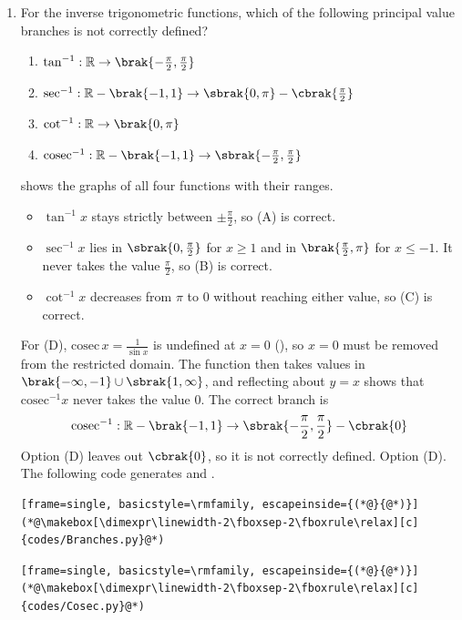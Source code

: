 \begin{enumerate}[label=\thesubsection.\arabic*, ref=\thesubsection.\theenumi]
\item For the inverse trigonometric functions, which of the following principal value branches is not correctly defined?
\begin{enumerate}[label=(\Alph*)]
	\item $\tan^{-1}: \mathbb{R} \to \brak{-\frac{\pi}{2}, \frac{\pi}{2}}$
	\item $\sec^{-1}: \mathbb{R}-\brak{-1,1} \to \sbrak{0,\pi} - \cbrak{\frac{\pi}{2}}$
	\item $\cot^{-1}: \mathbb{R} \to \brak{0,\pi}$
	\item $\text{cosec}^{-1}: \mathbb{R}-\brak{-1,1} \to \sbrak{-\frac{\pi}{2}, \frac{\pi}{2}}$
\end{enumerate}
\par\solution
{} shows the graphs of all four functions with their ranges.
\begin{itemize}
	\item $\tan^{-1}x$ stays strictly between $\pm\frac{\pi}{2}$, so (A) is correct.
	\item $\sec^{-1}x$ lies in $\sbrak{0,\frac{\pi}{2}}$ for $x \ge 1$ and in $\brak{\frac{\pi}{2},\pi}$ for $x \le -1$. It never takes the value $\frac{\pi}{2}$, so (B) is correct.
	\item $\cot^{-1}x$ decreases from $\pi$ to $0$ without reaching either value, so (C) is correct.
\end{itemize}
For (D), $\text{cosec}\,x = \frac{1}{\sin x}$ is undefined at $x = 0$ (), so $x = 0$ must be removed from the restricted domain. The function then takes values in $\brak{-\infty,-1}\cup\sbrak{1,\infty}$, and reflecting about $y = x$ shows that $\text{cosec}^{-1}x$ never takes the value $0$. The correct branch is
\begin{align}
	\text{cosec}^{-1}: \mathbb{R}-\brak{-1,1} \to \sbrak{-\frac{\pi}{2}, \frac{\pi}{2}} - \cbrak{0}
\end{align}
Option (D) leaves out $\cbrak{0}$, so it is not correctly defined. Option (D).
The following code generates  and .
\begin{lstlisting}[frame=single, basicstyle=\rmfamily, escapeinside={(*@}{@*)}]
(*@\makebox[\dimexpr\linewidth-2\fboxsep-2\fboxrule\relax][c]{codes/Branches.py}@*)
\end{lstlisting}
\begin{lstlisting}[frame=single, basicstyle=\rmfamily, escapeinside={(*@}{@*)}]
(*@\makebox[\dimexpr\linewidth-2\fboxsep-2\fboxrule\relax][c]{codes/Cosec.py}@*)

\end{lstlisting}
\end{enumerate}
